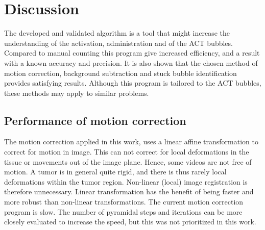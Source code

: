 \section{Discussion}
The developed and validated algorithm is a tool that might increase the understanding of the activation, administration and \texttrademark{} of the ACT\texttrademark{} bubbles. Compared to manual counting this program give increased efficiency, and a result with a known accuracy and precision. It is also shown that the chosen method of motion correction, background subtraction and stuck bubble identification provides satisfying results. Although this program is tailored to the ACT\texttrademark{} bubbles, these methods may apply to similar problems.
\subsection{Performance of motion correction}
The motion correction applied in this work, uses a linear affine transformation to correct for motion in image. This can not correct for local deformations in the tissue or movements out of the image plane. Hence, some videos are not free of motion. A tumor is in general quite rigid, and there is thus rarely local deformations within the tumor region. Non-linear (local) image registration is therefore unnecessary. Linear transformation has the benefit of being faster and more robust than non-linear transformations. The current motion correction program is slow. The number of pyramidal steps and iterations can be more closely evaluated to increase the speed, but this was not prioritized in this work. 

